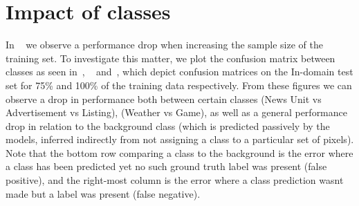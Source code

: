 \documentclass[oneside, english, bibtex]{kththesis}
\begin{document}
\begin{table}[H]
  \begin{center}
    \caption{Gradually increasing dataset size - 1 class - Out-set ()}
    \label{tab:dsizeonecoutset}
  \end{center}
\end{table}

\clearpage




\section{Impact of classes}

In ~ we observe a performance drop when increasing the sample size of the training set. To investigate this matter, we plot the confusion matrix between classes as seen in~, ~ and~, which depict confusion matrices on the In-domain test set for 75\% and 100\% of the training data respectively. From these figures we can observe a drop in performance both between certain classes (News Unit vs Advertisement vs Listing), (Weather vs Game), as well as a general performance drop in relation to the background class (which is predicted passively by the models, inferred indirectly from not assigning a class to a particular set of pixels). Note that the bottom row comparing a class to the background is the error where a class has been predicted yet no such ground truth label was present (false positive), and the right-most column is the error where a class prediction wasnt made but a label was present (false negative). 
\end{document}
